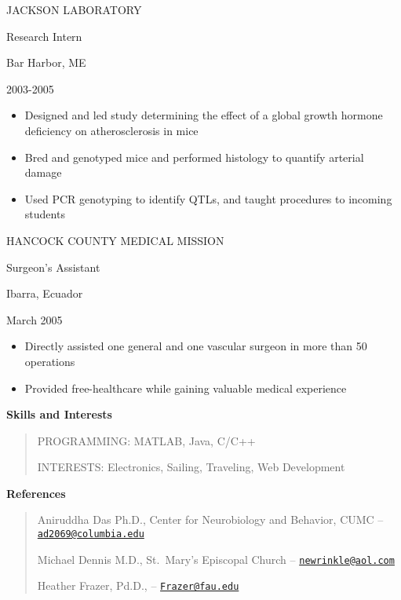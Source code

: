 JACKSON LABORATORY

Research Intern

Bar Harbor, ME

2003-2005

\begin{itemize}
\item
  Designed and led study determining the effect of a global growth
  hormone deficiency on atherosclerosis in mice
\item
  Bred and genotyped mice and performed histology to quantify arterial
  damage
\item
  Used PCR genotyping to identify QTLs, and taught procedures to
  incoming students
\end{itemize}

HANCOCK COUNTY MEDICAL MISSION

Surgeon's Assistant

Ibarra, Ecuador

March 2005

\begin{itemize}
\item
  Directly assisted one general and one vascular surgeon in more than 50
  operations
\item
  Provided free-healthcare while gaining valuable medical experience
\end{itemize}

\textbf{Skills and Interests}

\begin{quote}
PROGRAMMING: MATLAB, Java, C/C++

INTERESTS: Electronics, Sailing, Traveling, Web Development
\end{quote}

\textbf{References}

\begin{quote}
Aniruddha Das Ph.D., Center for Neurobiology and Behavior, CUMC --
\href{mailto:ad2069@columbia.edu}{\nolinkurl{ad2069@columbia.edu}}

Michael Dennis M.D., St.~Mary's Episcopal Church --
\href{mailto:newrinkle@aol.com}{\nolinkurl{newrinkle@aol.com}}

Heather Frazer, Pd.D., --
\href{mailto:Frazer@fau.edu}{\nolinkurl{Frazer@fau.edu}}
\end{quote}
